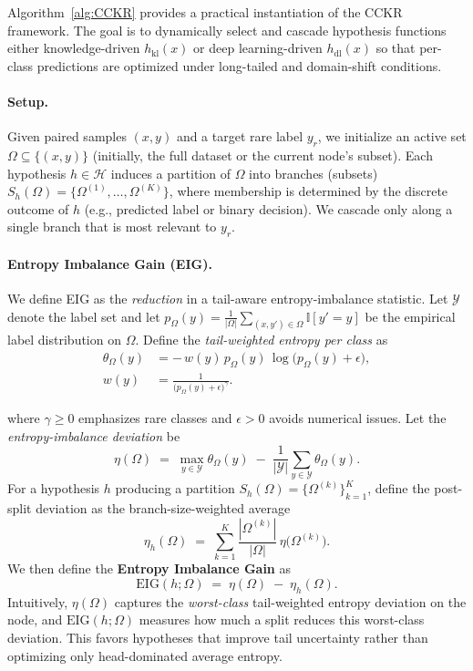 \documentclass{article}
\begin{document}
Algorithm~\ref{alg:CCKR} provides a practical instantiation of the CCKR framework.
The goal is to dynamically select and cascade hypothesis functions  either
knowledge-driven $h_{\text{kl}}(x)$ or deep learning-driven $h_{\text{dl}}(x)$  so that per-class predictions
are optimized under long-tailed and domain-shift conditions.

\paragraph{Setup.}
Given paired samples $(x,y)$ and a target rare label $y_r$, we initialize an active set
$\Omega \subseteq \{(x,y)\}$ (initially, the full dataset or the current node's subset).
Each hypothesis $h\in\mathcal{H}$ induces a partition of $\Omega$ into branches (subsets)
$S_h(\Omega)=\{\Omega^{(1)},\ldots,\Omega^{(K)}\}$, where membership is determined by the discrete outcome of $h$
(e.g., predicted label or binary decision). We cascade only along a single branch that is most relevant to $y_r$.

\paragraph{Entropy Imbalance Gain (EIG).}
We define EIG as the \emph{reduction} in a tail-aware entropy-imbalance statistic.
Let $\mathcal{Y}$ denote the label set and let $p_{\Omega}(y)=\frac{1}{|\Omega|}\sum_{(x,y')\in\Omega}\mathbb{I}[y'=y]$
be the empirical label distribution on $\Omega$.
Define the \emph{tail-weighted entropy per class} as
\begin{equation}
\begin{aligned}
\theta_{\Omega}(y)
&= -\,w(y)\,p_{\Omega}(y)\,\log\!\big(p_{\Omega}(y)+\epsilon\big), \\
w(y)
&= \frac{1}{\big(p_{\Omega}(y)+\epsilon\big)^{\gamma}}.
\end{aligned}
\end{equation}

where $\gamma\ge 0$ emphasizes rare classes and $\epsilon>0$ avoids numerical issues.
Let the \emph{entropy-imbalance deviation} be
\begin{equation}
\eta(\Omega)
\;=\;
\max_{y\in\mathcal{Y}}\theta_{\Omega}(y)\;-\;\frac{1}{|\mathcal{Y}|}\sum_{y\in\mathcal{Y}}\theta_{\Omega}(y).
\end{equation}
For a hypothesis $h$ producing a partition $S_h(\Omega)=\{\Omega^{(k)}\}_{k=1}^{K}$, define the post-split deviation as the
branch-size-weighted average
\begin{equation}
\eta_h(\Omega)
\;=\;
\sum_{k=1}^{K}\frac{|\Omega^{(k)}|}{|\Omega|}\,\eta\!\big(\Omega^{(k)}\big).
\end{equation}
We then define the \textbf{Entropy Imbalance Gain} as
\begin{equation}
\mathrm{EIG}(h;\Omega)
\;=\;
\eta(\Omega)\;-\;\eta_h(\Omega).
\label{eq:eig_def_B}
\end{equation}
Intuitively, $\eta(\Omega)$ captures the \emph{worst-class} tail-weighted entropy deviation on the node,
and $\mathrm{EIG}(h;\Omega)$ measures how much a split reduces this worst-class deviation. This favors hypotheses
that improve tail uncertainty rather than optimizing only head-dominated average entropy.
\end{document}

